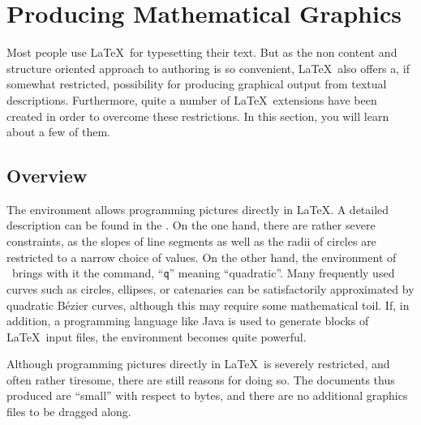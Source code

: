 \setcounter{chapter}{4}
\newcommand{\graphicscompanion}{\emph{The \LaTeX{} Graphics Companion}~\cite{graphicscompanion}} 
\newcommand{\hobby}{\emph{A User's Manual for \MP{}}~\cite{metapost}}
\newcommand{\hoenig}{\emph{\TeX{} Unbound}~\cite{unbound}}
\newcommand{\graphicsinlatex}{\emph{Graphics in \LaTeXe{}}~\cite{ursoswald}}

\chapter{Producing Mathematical Graphics}
\label{chap:graphics}

\begin{intro}
Most people use \LaTeX\ for typesetting their text. But as the non content and
structure oriented approach to authoring is so convenient, \LaTeX\ also offers a,
if somewhat restricted, possibility for producing graphical output from textual 
descriptions. Furthermore, quite a number of \LaTeX\ extensions have been created 
in order to overcome these restrictions. In this section, you will learn about a 
few of them.
\end{intro}

\section{Overview}

The  environment allows programming pictures directly in
\LaTeX. A detailed
description can be found in the \manual. On the one hand, there are rather
severe constraints, as the slopes of line segments as well as the radii of
circles are restricted to a narrow choice of values.  On the other hand, the
 environment of \LaTeXe\ brings with it the 
command, ``\texttt{q}'' meaning ``quadratic''.  Many frequently used curves
such as circles, ellipses, or catenaries can be satisfactorily approximated
by quadratic B\'ezier curves, although this may require some mathematical
toil. If, in addition, a programming language like Java is used to generate
 blocks of \LaTeX\ input files, the  environment
becomes quite powerful.

Although programming pictures directly in \LaTeX\ is severely restricted,
and often rather tiresome, there are still reasons for doing so. The documents
thus produced are ``small'' with respect to bytes, and there are no additional
graphics files to be dragged along.

